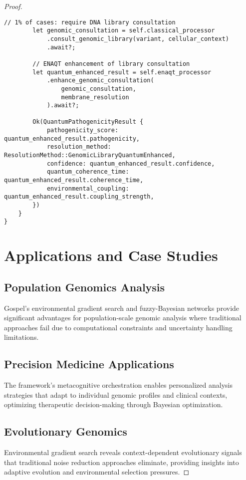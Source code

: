 \documentclass[12pt,a4paper]{article}
\begin{document}
\begin{proof}
\begin{lstlisting}[style=ruststyle, caption=Quantum-Enhanced Genomic Processing]
        // 1% of cases: require DNA library consultation
        let genomic_consultation = self.classical_processor
            .consult_genomic_library(variant, cellular_context)
            .await?;
        
        // ENAQT enhancement of library consultation
        let quantum_enhanced_result = self.enaqt_processor
            .enhance_genomic_consultation(
                genomic_consultation,
                membrane_resolution
            ).await?;
        
        Ok(QuantumPathogenicityResult {
            pathogenicity_score: quantum_enhanced_result.pathogenicity,
            resolution_method: ResolutionMethod::GenomicLibraryQuantumEnhanced,
            confidence: quantum_enhanced_result.confidence,
            quantum_coherence_time: quantum_enhanced_result.coherence_time,
            environmental_coupling: quantum_enhanced_result.coupling_strength,
        })
    }
}
\end{lstlisting}

\section{Applications and Case Studies}

\subsection{Population Genomics Analysis}

Gospel's environmental gradient search and fuzzy-Bayesian networks provide significant advantages for population-scale genomic analysis where traditional approaches fail due to computational constraints and uncertainty handling limitations.

\subsection{Precision Medicine Applications}

The framework's metacognitive orchestration enables personalized analysis strategies that adapt to individual genomic profiles and clinical contexts, optimizing therapeutic decision-making through Bayesian optimization.

\subsection{Evolutionary Genomics}

Environmental gradient search reveals context-dependent evolutionary signals that traditional noise reduction approaches eliminate, providing insights into adaptive evolution and environmental selection pressures.


\end{proof}
\end{document}
